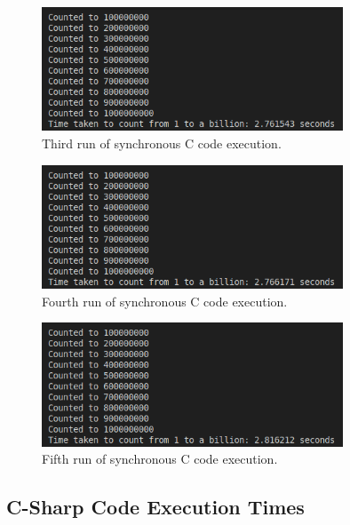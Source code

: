 \documentclass{article}
\begin{document}
\begin{figure}[htbp]
    \centering
    \includegraphics[width=0.8\textwidth]{../records/results_c/result_3.png}
    \caption{Third run of synchronous C code execution.}
    \label{fig:C-runtime-3}
\end{figure}

\begin{figure}[htbp]
    \centering
    \includegraphics[width=0.8\textwidth]{../records/results_c/result_4.png}
    \caption{Fourth run of synchronous C code execution.}
    \label{fig:C-runtime-4}
\end{figure}

\begin{figure}[htbp]
    \centering
    \includegraphics[width=0.8\textwidth]{../records/results_c/result_5.png}
    \caption{Fifth run of synchronous C code execution.}
    \label{fig:C-runtime-5}
\end{figure}

\clearpage
\subsection{C-Sharp Code Execution Times} 
\end{document}
